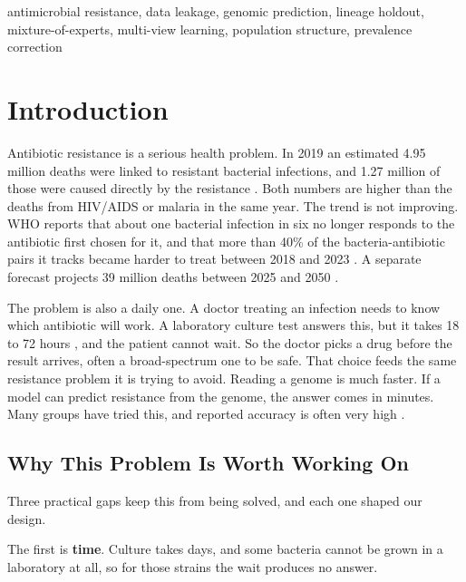 \documentclass[conference]{IEEEtran}
\begin{document}
\begin{IEEEkeywords}
antimicrobial resistance, data leakage, genomic prediction, lineage holdout,
mixture-of-experts, multi-view learning, population structure, prevalence
correction
\end{IEEEkeywords}

\section{Introduction}
\label{sec:intro}

Antibiotic resistance is a serious health problem. In 2019 an estimated 4.95
million deaths were linked to resistant bacterial infections, and 1.27 million of
those were caused directly by the resistance \cite{murray2022}. Both numbers are
higher than the deaths from HIV/AIDS or malaria in the same year. The trend is not
improving. WHO reports that about one bacterial infection in six no longer responds
to the antibiotic first chosen for it, and that more than 40\% of the
bacteria-antibiotic pairs it tracks became harder to treat between 2018 and 2023
\cite{who2025glass}. A separate forecast projects 39 million deaths between 2025
and 2050 \cite{naghavi2024}.

The problem is also a daily one. A doctor treating an infection needs to know which
antibiotic will work. A laboratory culture test answers this, but it takes 18 to 72
hours \cite{ren2022,who2019}, and the patient cannot wait. So the doctor picks a
drug before the result arrives, often a broad-spectrum one to be safe. That choice
feeds the same resistance problem it is trying to avoid. Reading a genome is much
faster. If a model can predict resistance from the genome, the answer comes in
minutes. Many groups have tried this, and reported accuracy is often very high
\cite{moradigaravand2018,ren2022,wang2025}.

\subsection{Why This Problem Is Worth Working On}

Three practical gaps keep this from being solved, and each one shaped our design.

The first is \textbf{time}. Culture takes days, and some bacteria cannot be grown
in a laboratory at all, so for those strains the wait produces no answer.
\end{document}
